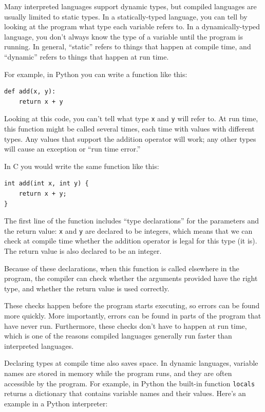 \documentclass[12pt]{book}
\begin{document}
Many interpreted languages support dynamic types, but compiled
languages are usually limited to static types.  In a statically-typed
language, you can tell by looking at the program what type each
variable refers to.  In a dynamically-typed language,
you don't always know the type of a variable until the
program is running.  In general, ``static'' refers to things that
happen at compile time, and ``dynamic'' refers to things that happen
at run time.

For example, in Python you can write a function like this:

\begin{verbatim}
def add(x, y):
    return x + y
\end{verbatim}

Looking at this code, you can't tell what type {\tt x} and {\tt y}
will refer to.  At run time, this function might be called several
times, each time with values with different types.  Any values that
support the addition operator will work; any other types will cause an
exception or ``run time error.''

In C you would write the same function like this:

\begin{verbatim}
int add(int x, int y) {
    return x + y;
}
\end{verbatim}

The first line of the function includes ``type declarations'' for the
parameters and the return value: {\tt x} and {\tt y} are declared to
be integers, which means that we can check at compile time
whether the addition operator is legal for this type (it is).  The
return value is also declared to be an integer.

Because of these declarations, when this function is called elsewhere
in the program, the compiler can check whether the arguments provided
have the right type, and whether the return value is used correctly.

These checks happen before the program starts executing, so errors can
be found more quickly.  More importantly, errors can be found in parts
of the program that have never run.  Furthermore, these checks don't
have to happen at run time, which is one of the reasons compiled
languages generally run faster than interpreted languages.

Declaring types at compile time also saves space.  In dynamic
languages, variable names are stored in memory while the program runs,
and they are often accessible by the program.  For example, in Python
the built-in function {\tt locals} returns a dictionary that contains
variable names and their values.  Here's an example in a Python
interpreter:
\end{document}
